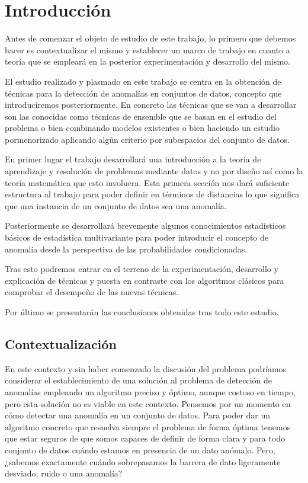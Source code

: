 \chapter{Introducción}
\label{chapter:introduccion}
\setcounter{page}{1}

Antes de comenzar el objeto de estudio de este trabajo, lo primero que debemos hacer es contextualizar el mismo y establecer un marco de trabajo en cuanto a teoría que se empleará en la posterior experimentación y desarrollo del mismo. 

El estudio realizado y plasmado en este trabajo se centra en la obtención de técnicas para la detección de anomalías en conjuntos de datos, concepto que introduciremos posteriormente. En concreto las técnicas que se van a desarrollar son las conocidas como técnicas de ensemble que se basan en el estudio del problema o bien combinando modelos existentes o bien haciendo un estudio pormenorizado aplicando algún criterio por subespacios del conjunto de datos. 

En primer lugar el trabajo desarrollará una introducción a la teoría de aprendizaje y resolución de problemas mediante datos y no por diseño así como la teoría matemática que esto involucra. Esta primera sección nos dará suficiente estructura al trabajo para poder definir en términos de distancias lo que significa que una instancia de un conjunto de datos sea una anomalía.

Posteriormente se desarrollará brevemente algunos conocimientos estadísticos básicos de estadística multivariante para poder introducir el concepto de anomalía desde la perspectiva de las probabilidades condicionadas.

Tras esto podremos entrar en el terreno de la experimentación, desarrollo y explicación de técnicas y puesta en contraste con los algoritmos clásicos para comprobar el desempeño de las nuevas técnicas.

Por último se presentarán las conclusiones obtenidas tras todo este estudio.

\section{Contextualización}

En este contexto y sin haber comenzado la discusión del problema podríamos considerar el establecimiento de una solución al problema de detección de anomalías empleando un algoritmo preciso y óptimo, aunque costoso en tiempo, pero esta solución no es viable en este contexto. Pensemos por un momento en cómo detectar una anomalía en un conjunto de datos. Para poder dar un algoritmo concreto que resuelva siempre el problema de forma óptima tenemos que estar seguros de que somos capaces de definir de forma clara y para todo conjunto de datos cuándo estamos en presencia de un dato anómalo. Pero, ¿sabemos exactamente cuándo sobrepasamos la barrera de dato ligeramente desviado, ruido o una anomalía? 

